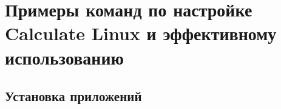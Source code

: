\newpage
\chapter{Примеры команд по настройке Calculate Linux и эффективному использованию}
\section{Установка приложений}
